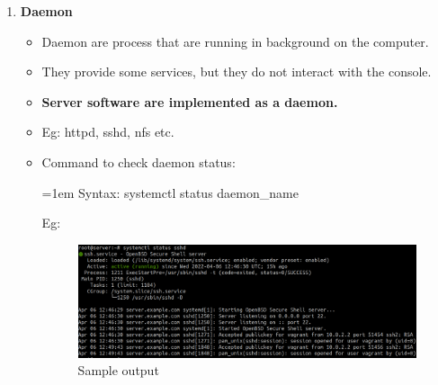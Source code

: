 \begin{flushleft}
\begin{enumerate}
\begin{itemize}
	
	\end{itemize}
\newpage
	\item \textbf{Daemon}
	\begin{itemize}
		\item Daemon are process that are running in background on the computer.
		\item They provide some services, but they do not interact with the console.
		\item \textbf{Server software are implemented as a daemon.}
		\item Eg: httpd, sshd, nfs etc.
		\item Command to check daemon status:
		\bigskip
		\begin{tcolorbox}[breakable,notitle,boxrule=-0pt,colback=pink,colframe=pink]
			\color{black}
			\font=1em
			Syntax: systemctl status daemon\_name
			\font=4pt
		\end{tcolorbox}
		Eg:
		\begin{figure}[h!]
			\centering
			\includegraphics[scale=.25]{content/chapter12/images/proc.png}
			\caption{Sample output}
			\label{fig:process23}
		\end{figure}
	\end{itemize}
	
	

	
	
\end{enumerate}
	
		
\end{flushleft}

\newpage


